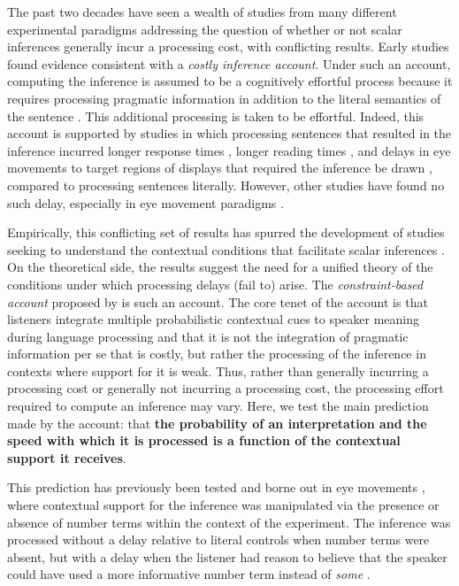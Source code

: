 \documentclass[10pt,letterpaper]{article}
\newcommand{\jd}[1]{\textcolor{Red}{[jd: #1]}}
\begin{document}
The past two decades have seen a wealth of studies from many different experimental paradigms addressing the question of whether or not scalar inferences generally incur a processing cost, with conflicting results. Early studies found evidence consistent with a \emph{costly inference account}. Under such an account, computing the inference is assumed to be a cognitively effortful process because it requires processing pragmatic information in addition to the literal semantics of the sentence  \cite{HuangSnedeker2009, TomlinsonEtAl2012}. This additional processing is taken to be effortful. Indeed, this account is supported by studies in which processing sentences that resulted in the inference incurred longer response times \cite{BottNoveck2004, TomlinsonEtAl2012,DegenTanenhaus2015}, longer reading times \cite{BrehenyEtAl2006}, and delays in eye movements to target regions of displays that required the inference be drawn \cite{HuangSnedeker2009,HuangSnedeker2011,DegenTanenhaus2016}, compared to  processing sentences literally. However, other studies have found no such delay, especially in eye movement paradigms \cite{Grodner2010,Breheny2013,DegenTanenhaus2016,SunBreheny2019}. 

Empirically, this conflicting set of results has spurred the development of studies seeking to understand the contextual conditions that facilitate scalar inferences \cite{Zondervan2010,BonnefonEtAl2009,Degen2015,Augurzky2019,MartyChemla2013,DegenGoodman2014,SunBreheny2019}. On the theoretical side, the results suggest the need for a unified theory of the conditions under which processing delays (fail to) arise. The \emph{constraint-based account} proposed by  is such an account. The core tenet of the account is that listeners integrate multiple probabilistic contextual cues to speaker meaning during language processing and that it is not the integration of pragmatic information per se that is costly, but rather the processing of the inference in contexts where support for it is weak. Thus, rather than generally incurring a processing cost or generally not incurring a processing cost, the processing effort required to compute an inference may vary. Here, we test the main prediction made by the account: that \textbf{the probability of an interpretation and the speed with which it is processed is a function of the contextual support it receives}. 

This prediction has previously been tested and borne out in eye movements \cite{DegenTanenhaus2016}, where contextual support for the inference was manipulated via the presence or absence of number terms within the context of the experiment. The inference was processed without a delay relative to literal controls when number terms were absent, but with a delay when the listener had reason to believe that the speaker could have used a more informative number term instead of \emph{some} \cite{DegenTanenhaus2016}.%
\end{document}
